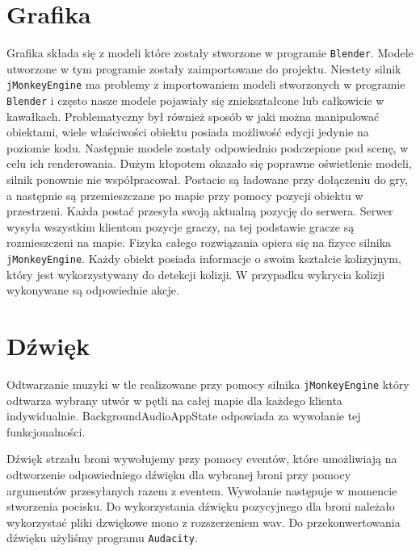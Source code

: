 \documentclass[]{report}
\newcommand{\code}[1]{\colorbox{codegray}{\texttt{#1}}}
\begin{document}
\section{Grafika}
	Grafika składa się z modeli które zostały stworzone w programie \code{Blender}.
	Modele utworzone w tym programie zostały zaimportowane do projektu. 
	Niestety silnik \code{jMonkeyEngine} ma problemy z importowaniem modeli stworzonych w programie \code{Blender} i często nasze modele pojawiały się zniekształcone lub całkowicie w kawałkach.
	Problematyczny był również sposób w jaki można manipulować obiektami, wiele właściwości obiektu posiada możliwość edycji jedynie na poziomie kodu. 
	Następnie modele zostały odpowiednio podczepione pod scenę, w celu ich renderowania.
	Dużym kłopotem okazało się poprawne oświetlenie modeli, silnik ponownie nie współpracował.
	Postacie są ładowane przy dołączeniu do gry, a następnie są przemieszczane po mapie przy pomocy pozycji obiektu w przestrzeni.
	Każda postać przesyła swoją aktualną pozycję do serwera.
	Serwer wysyła wszystkim klientom pozycje graczy, na tej podstawie gracze są rozmieszczeni na mapie.
	Fizyka całego rozwiązania opiera się na fizyce silnika \code{jMonkeyEngine}.
	Każdy obiekt posiada informacje o swoim kształcie kolizyjnym, który jest wykorzystywany do detekcji kolizji.
	W przypadku wykrycia kolizji wykonywane są odpowiednie akcje.

\section{Dźwięk}
	Odtwarzanie muzyki w tle realizowane przy pomocy silnika \code{jMonkeyEngine} który odtwarza wybrany utwór w pętli na całej mapie dla każdego klienta indywidualnie.
	BackgroundAudioAppState odpowiada za wywołanie tej funkcjonalności.

	Dźwięk strzału broni wywołujemy przy pomocy eventów, które umożliwiają na odtworzenie odpowiedniego dźwięku dla wybranej broni przy pomocy argumentów przesyłanych razem z eventem.
	Wywołanie następuje w momencie stworzenia pocisku.
	Do wykorzystania dźwięku pozycyjnego dla broni należało wykorzystać pliki dzwiękowe mono z rozszerzeniem wav.
	Do przekonwertowania dźwięku użyliśmy programu \code{Audacity}.
\end{document}
